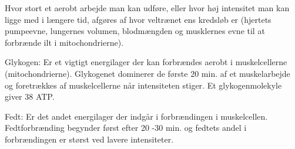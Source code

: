 Hvor stort et aerobt arbejde man kan udføre, eller hvor høj intensitet man kan ligge med i længere tid, afgøres af hvor veltrænet ens kredsløb er (hjertets pumpeevne, lungernes volumen, blodmængden og musklernes evne til at forbrænde ilt i mitochondrierne).

Glykogen: Er et vigtigt energilager der kan forbrændes aerobt i muskelcellerne (mitochondrierne). Glykogenet dominerer de første 20 min. af et muskelarbejde og foretrækkes af muskelcellerne når intensiteten stiger. Et glykogenmolekyle giver 38 ATP.

Fedt: Er det andet energilager der indgår i forbrændingen i muskelcellen. Fedtforbrænding begynder først efter 20 -30 min. og fedtets andel i forbrændingen er størst ved lavere intensiteter.


